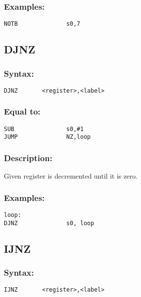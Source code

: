         \subsubsection{Examples:}
            {
                \usecodefont
                \verb'NOTB              s0,7'\\
            }

    \subsection{DJNZ}
        \subsubsection{Syntax:}
            {
                \usecodefont
                \verb'DJNZ       <register>,<label>'
            }

        \subsubsection{Equal to:}
            {
                \usecodefont
                \verb'SUB               s0,#1'\\
                \verb'JUMP              NZ,loop'\\
            }

        \subsubsection{Description:}
            Given register is decremented until it is zero.

        \subsubsection{Examples:}
            {
                \usecodefont
                \verb'loop:             '\\
                \verb'DJNZ              s0, loop'\\
            }

    \subsection{IJNZ}
        \subsubsection{Syntax:}
            \verb'IJNZ       <register>,<label>'

